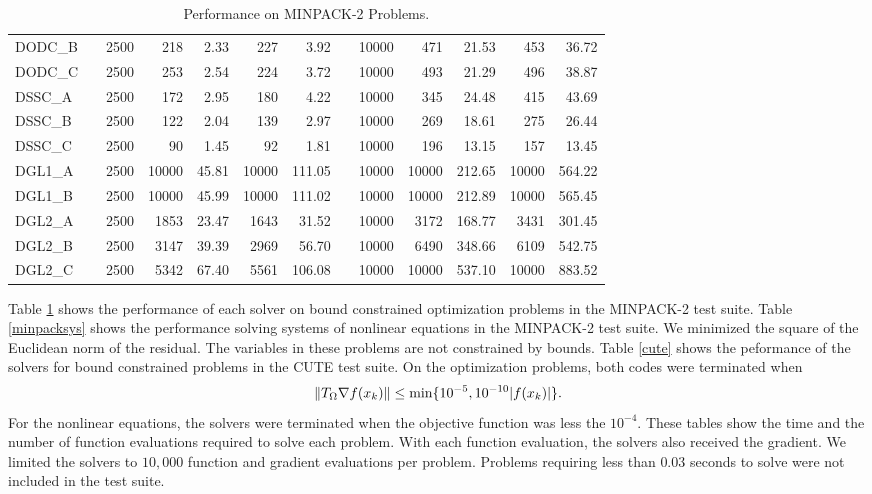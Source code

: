 \begin{table}[bhpt]
\begin{center}
\begin{tabular}{|l|c|r|rr|rr|c|r|rr|rr|}
DODC\_B & & 2500 &  218 & 2.33 &  227 &  3.92  &   & 10000 &  471 & 21.53 &  453 &  36.72  \\ 
DODC\_C & & 2500 &  253 & 2.54 &  224 &  3.72  &   & 10000 &  493 & 21.29 &  496 &  38.87  \\ 
DSSC\_A & & 2500 &  172 & 2.95 &  180 &  4.22  &   & 10000 &  345 & 24.48 &  415 &  43.69  \\ 
DSSC\_B & & 2500 &  122 & 2.04 &  139 &  2.97  &   & 10000 &  269 & 18.61 &  275 &  26.44  \\ 
DSSC\_C & & 2500 &  90 & 1.45 &  92 &  1.81  &   & 10000 &  196 & 13.15 &  157 &  13.45  \\ 
DGL1\_A & & 2500 &  10000 & 45.81 &  10000 &  111.05  &   & 10000 &  10000 & 212.65 &  10000 &  564.22  \\ 
DGL1\_B & & 2500 &  10000 & 45.99 &  10000 &  111.02  &   & 10000 &  10000 & 212.89 &  10000 &  565.45  \\ 
DGL2\_A & & 2500 &  1853 & 23.47 &  1643 &  31.52  &   & 10000 &  3172 & 168.77 &  3431 &  301.45  \\ 
DGL2\_B & & 2500 &  3147 & 39.39 &  2969 &  56.70  &   & 10000 &  6490 & 348.66 &  6109 &  542.75  \\ 
DGL2\_C & & 2500 &  5342 & 67.40 &  5561 &  106.08  &   & 10000 &  10000 & 537.10 &  10000 &  883.52  \\ 

\hline
\end{tabular}
\caption{Performance on MINPACK-2 Problems.}
\label{minpack2}
\end{center}
\end{table}


Table \ref{minpack2} shows the performance of each solver on
bound constrained optimization problems in the MINPACK-2\cite{minpack2test} 
test suite.
Table \ref{minpacksys} shows the performance solving systems of
nonlinear equations in the MINPACK-2 test suite.  We minimized the
square of the Euclidean norm of the residual.  The variables in these
problems are not constrained by bounds.
Table \ref{cute} shows the peformance of the solvers for bound constrained
problems in the CUTE test suite.
On the optimization problems,
both codes
were terminated when
\[ \| T_{\Omega} \nabla f(x_k) \| \leq  \mbox{min}\{ 10^{-5}, 10^{-10} |f(x_k)| \}. \]
For the nonlinear equations, the solvers were terminated when
the objective function was less the $10^{-4}$.
These tables show the time  and the number of 
function evaluations required to solve each problem.
With each function evaluation, the solvers also received the gradient.
We limited the solvers to $10,000$ function and gradient evaluations 
per problem.   Problems requiring less than $0.03$ seconds to solve were not
included in the test suite.


